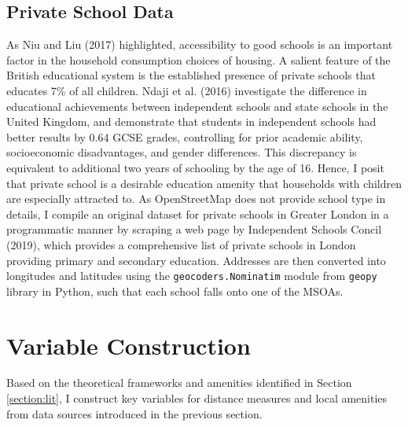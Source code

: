 \documentclass{article}
\begin{document}
\subsection{Private School Data} \label{subsection:school}
As Niu and Liu (2017) highlighted, accessibility to good schools is an important factor in the household consumption choices of housing. A salient feature of the British educational system is the established presence of private schools that educates 7\% of all children. Ndaji et al. (2016) investigate the difference in educational achievements between independent schools and state schools in the United Kingdom, and demonstrate that students in independent schools had better results by 0.64 GCSE grades, controlling for prior academic ability, socioeconomic disadvantages, and gender differences. This discrepancy is equivalent to additional two years of schooling by the age of 16. Hence, I posit that private school is a desirable education amenity that households with children are especially attracted to. As OpenStreetMap does not provide school type in details, I compile an original dataset for private schools in Greater London in a programmatic manner by scraping a web page by Independent Schools Concil (2019), which provides a comprehensive list of private schools in London providing primary and secondary education. Addresses are then converted into longitudes and latitudes using the \texttt{geocoders.Nominatim} module from \texttt{geopy} library in Python, such that each school falls onto one of the MSOAs.

\section{Variable Construction} \label{section:variables}
Based on the theoretical frameworks and amenities identified in Section \ref{section:lit}, I construct key variables for distance measures and local amenities from data sources introduced in the previous section.
\end{document}
